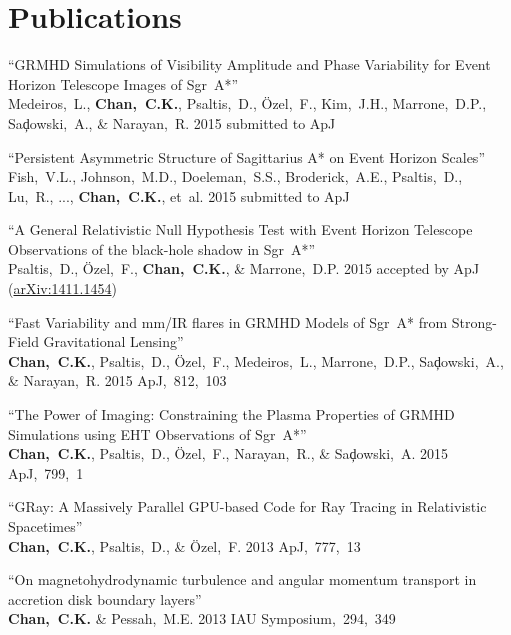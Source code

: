 \section*{Publications}

\begin{ilist}

\item ``GRMHD Simulations of Visibility Amplitude and Phase Variability for Event Horizon Telescope Images of Sgr~A*'' \\
  Medeiros,~L., \textbf{Chan,~C.K.}, Psaltis,~D., {\"O}zel,~F., Kim,~J.H., Marrone,~D.P., Sa{\c d}owski,~A., \& Narayan,~R.
  2015 submitted to ApJ

\item ``Persistent Asymmetric Structure of Sagittarius A* on Event Horizon Scales''
  Fish,~V.L., Johnson,~M.D., Doeleman,~S.S., Broderick,~A.E., Psaltis,~D., Lu,~R., ..., \textbf{Chan,~C.K.}, et~al.
  2015 submitted to ApJ

\item ``A General Relativistic Null Hypothesis Test with Event Horizon Telescope Observations of the black-hole shadow in Sgr~A*''\\
  Psaltis,~D., {\"O}zel,~F., \textbf{Chan,~C.K.}, \& Marrone,~D.P.
  2015 accepted by ApJ (\href{http://arxiv.org/abs/1411.1454}{arXiv:1411.1454})

\item ``Fast Variability and mm/IR flares in GRMHD Models of Sgr~A* from Strong-Field Gravitational Lensing''\\
  \textbf{Chan,~C.K.}, Psaltis,~D., {\"O}zel,~F., Medeiros,~L., Marrone,~D.P., Sa{\c d}owski,~A., \& Narayan,~R.
  2015 ApJ,~812,~103

\item ``The Power of Imaging: Constraining the Plasma Properties of GRMHD Simulations using EHT Observations of Sgr~A*''\\
  \textbf{Chan,~C.K.}, Psaltis,~D., {\"O}zel,~F., Narayan,~R., \& Sa{\c d}owski,~A.
  2015 ApJ,~799,~1

\item ``GRay: A Massively Parallel GPU-based Code for Ray Tracing in Relativistic Spacetimes''\\
  \textbf{Chan,~C.K.}, Psaltis,~D., \& {\"O}zel,~F.
  2013 ApJ,~777,~13

\item ``On magnetohydrodynamic turbulence and angular momentum transport in accretion disk boundary layers''\\
  \textbf{Chan,~C.K.} \& Pessah,~M.E.
  2013 IAU Symposium,~294,~349


\end{ilist}
